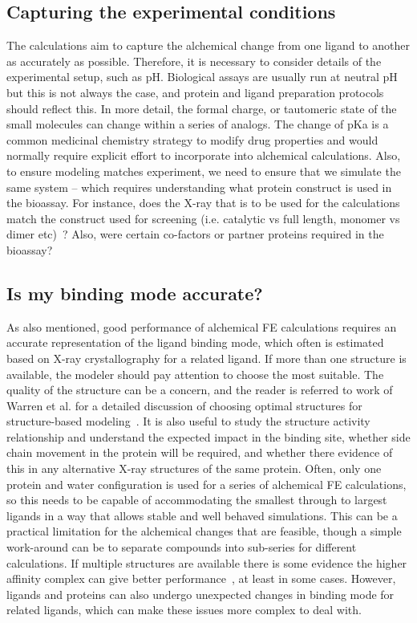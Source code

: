 \documentclass[9pt,bestpractices]{livecoms}
\begin{document}
\subsection{Capturing the experimental conditions}
The calculations aim to capture the alchemical change from one ligand to another as accurately as possible. Therefore, it is necessary to consider details of the experimental setup, such as pH. Biological assays are usually run at neutral pH but this is not always the case, and protein and ligand preparation protocols should reflect this. In more detail, the formal charge, or tautomeric state of the small molecules can change within a series of analogs. The change of pKa is a common medicinal chemistry strategy to modify drug properties and would normally require explicit effort to incorporate into alchemical calculations. Also, to ensure modeling matches experiment, we need to ensure that we simulate the same system -- which requires understanding what protein construct is used in the bioassay. For instance, does the X-ray that is to be used for the calculations match the construct used for screening (i.e. catalytic vs full length, monomer vs dimer etc)~\cite{perez-benito2018predicting}? Also, were certain co-factors or partner proteins required in the bioassay? 
%
\subsection{Is my binding mode accurate?}
As also mentioned, good performance of alchemical FE calculations requires an accurate representation of the ligand binding mode, which often is estimated based on X-ray crystallography for a related ligand. If more than one structure is available, the modeler should pay attention to choose the most suitable. The quality of the structure can be a concern, and the reader is referred to work of Warren et al. for a detailed discussion of choosing optimal structures for structure-based modeling~\cite{warren2012essential}. It is also useful to study the structure activity relationship and understand the expected impact in the binding site, whether side chain movement in the protein will be required, and whether there evidence of this in any alternative X-ray structures of the same protein. Often, only one protein and water configuration is used for a series of alchemical FE calculations, so this needs to be capable of accommodating the smallest through to largest ligands in a way that allows stable and well behaved simulations. This can be a practical limitation for the alchemical changes that are feasible, though a simple work-around can be to separate compounds into sub-series for different calculations. If multiple structures are available there is some evidence the higher affinity complex can give better performance~\cite{perez-benito2019predicting}, at least in some cases. However, ligands and proteins can also undergo unexpected changes in binding mode for related ligands, which can make these issues more complex to deal with.
\end{document}
